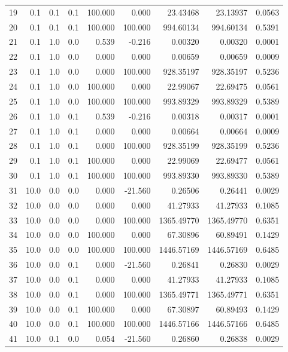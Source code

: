 \begin{longtable}{rrrrrrrrr}
    19 & 0.1 & 0.1 & 0.1 & 100.000 & 0.000 & 23.43468 & 23.13937 & 0.0563 \\
    20 & 0.1 & 0.1 & 0.1 & 100.000 & 100.000 & 994.60134 & 994.60134 & 0.5391 \\
    21 & 0.1 & 1.0 & 0.0 & 0.539 & -0.216 & 0.00320 & 0.00320 & 0.0001 \\
    22 & 0.1 & 1.0 & 0.0 & 0.000 & 0.000 & 0.00659 & 0.00659 & 0.0009 \\
    23 & 0.1 & 1.0 & 0.0 & 0.000 & 100.000 & 928.35197 & 928.35197 & 0.5236 \\
    24 & 0.1 & 1.0 & 0.0 & 100.000 & 0.000 & 22.99067 & 22.69475 & 0.0561 \\
    25 & 0.1 & 1.0 & 0.0 & 100.000 & 100.000 & 993.89329 & 993.89329 & 0.5389 \\
    26 & 0.1 & 1.0 & 0.1 & 0.539 & -0.216 & 0.00318 & 0.00317 & 0.0001 \\
    27 & 0.1 & 1.0 & 0.1 & 0.000 & 0.000 & 0.00664 & 0.00664 & 0.0009 \\
    28 & 0.1 & 1.0 & 0.1 & 0.000 & 100.000 & 928.35199 & 928.35199 & 0.5236 \\
    29 & 0.1 & 1.0 & 0.1 & 100.000 & 0.000 & 22.99069 & 22.69477 & 0.0561 \\
    30 & 0.1 & 1.0 & 0.1 & 100.000 & 100.000 & 993.89330 & 993.89330 & 0.5389 \\
    31 & 10.0 & 0.0 & 0.0 & 0.000 & -21.560 & 0.26506 & 0.26441 & 0.0029 \\
    32 & 10.0 & 0.0 & 0.0 & 0.000 & 0.000 & 41.27933 & 41.27933 & 0.1085 \\
    33 & 10.0 & 0.0 & 0.0 & 0.000 & 100.000 & 1365.49770 & 1365.49770 & 0.6351 \\
    34 & 10.0 & 0.0 & 0.0 & 100.000 & 0.000 & 67.30896 & 60.89491 & 0.1429 \\
    35 & 10.0 & 0.0 & 0.0 & 100.000 & 100.000 & 1446.57169 & 1446.57169 & 0.6485 \\
    36 & 10.0 & 0.0 & 0.1 & 0.000 & -21.560 & 0.26841 & 0.26830 & 0.0029 \\
    37 & 10.0 & 0.0 & 0.1 & 0.000 & 0.000 & 41.27933 & 41.27933 & 0.1085 \\
    38 & 10.0 & 0.0 & 0.1 & 0.000 & 100.000 & 1365.49771 & 1365.49771 & 0.6351 \\
    39 & 10.0 & 0.0 & 0.1 & 100.000 & 0.000 & 67.30897 & 60.89493 & 0.1429 \\
    40 & 10.0 & 0.0 & 0.1 & 100.000 & 100.000 & 1446.57166 & 1446.57166 & 0.6485 \\
    41 & 10.0 & 0.1 & 0.0 & 0.054 & -21.560 & 0.26860 & 0.26838 & 0.0029 \\

\end{longtable}
